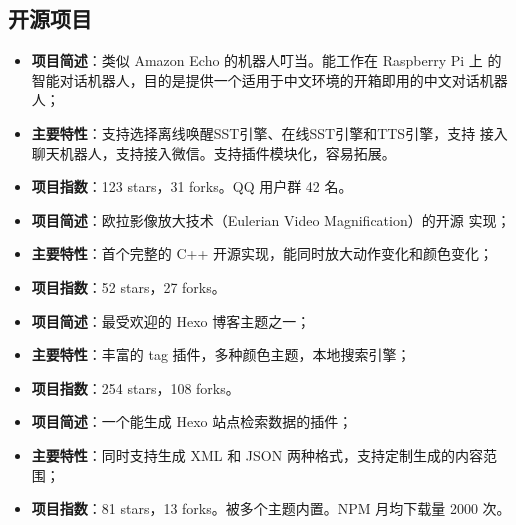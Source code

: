 \documentclass[11pt,a4paper,nolmodern]{moderncv}
\begin{document}
\subsection{\hei 开源项目}

%
  {
\begin{itemize}
\item \textbf{项目简述}：类似 Amazon Echo 的机器人叮当。能工作在 Raspberry Pi 上
  的智能对话机器人，目的是提供一个适用于中文环境的开箱即用的中文对话机器人；
\item \textbf{主要特性}：支持选择离线唤醒SST引擎、在线SST引擎和TTS引擎，支持
  接入聊天机器人，支持接入微信。支持插件模块化，容易拓展。
\item \textbf{项目指数}：123 stars，31 forks。QQ 用户群 42 名。
\end{itemize}}

%
  {
\begin{itemize}
\item \textbf{项目简述}：欧拉影像放大技术（Eulerian Video Magnification）的开源
  实现；
\item \textbf{主要特性}：首个完整的 C++ 开源实现，能同时放大动作变化和颜色变化；
\item \textbf{项目指数}：52 stars，27 forks。
\end{itemize}}

%
  {
\begin{itemize}
\item \textbf{项目简述}：最受欢迎的 Hexo 博客主题之一；
\item \textbf{主要特性}：丰富的 tag 插件，多种颜色主题，本地搜索引擎；
\item \textbf{项目指数}：254 stars，108 forks。
\end{itemize}}

%
  {
\begin{itemize}
\item \textbf{项目简述}：一个能生成 Hexo 站点检索数据的插件；
\item \textbf{主要特性}：同时支持生成 XML 和
  JSON 两种格式，支持定制生成的内容范围；
\item \textbf{项目指数}：81 stars，13 forks。被多个主题内置。NPM 月均下载量 2000 次。
\end{itemize}}
\end{document}
